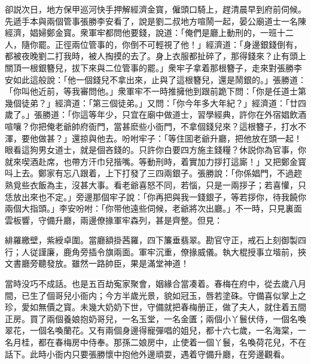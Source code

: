 卻説次日，地方保甲巡河快手押解經濟金寳，僱頭口騎上，趕清晨早到府前伺候。先遞手本與兩個管事張勝李安看了，說是劉二叔地方喧鬧一起，晏公廟道士一名陳經濟，娼婦鄭金寳。衆軍牢都問他要錢，說道：「俺們是廳上動刑的，一班十二人，隨你罷。正徑兩位管事的，你倒不可輕視了他！」經濟道：「身邊銀錢倒有，都被夜晚劉二打我時，被人掏摸的去了。身上衣服都扯碎了，那得錢來？止有頭上關頂一根銀簪兒，拔下來與二位管事的罷。」衆牢子拿着那根簪子，走來對張勝李安如此這般說：「他一個錢兒不拿出來，止與了這根簪兒，還是鬧銀的。」張勝道：「你叫他近前，等我審問他。」衆軍牢不一時推擁他到跟前跪下問：「你是任道士第幾個徒弟？」經濟道：「第三個徒弟。」又問：「你今年多大年紀？」經濟道：「廿四歲了。」張勝道：「你這等年少，只宜在廟中做道士，習學經典，許你在外宿娼飲酒喧嚷？你把俺老爺帥府衙門，當甚麽些小衙門，不拿個錢兒來？這根簪子，打水不渾，要他做甚？」還掠與他去。吩咐牢子：「等住囬老爺升廳，把他放在頭一起！眼看這狗男女道士，就是個吝錢的。只許你白要四方施主錢糧？休説你為官事，你就來喫酒赴席，也帶方汗巾兒揩嘴。等動刑時，着實加力拶打這廝！」又把鄭金寳呌上去。鄭家有忘八跟着，上下打發了三四兩銀子。張勝說：「你係娼門，不過趂熟覓些衣飯為主，沒甚大事。看老爺喜怒不同，若惱，只是一兩拶子；若喜懽，只恁放出來也不定。」旁邊那個牢子說：「你再把與我一錢銀子，等若拶你，待我饒你兩個大指頭。」李安吩咐：「你带他遠些伺候，老爺將次出廳。」不一時，只見裏面雲板響，守備升廳，兩邊僚掾軍牢森列，甚是齊整。但見：

\begin{myquote}
緋羅繳壁，紫綬卓圍。當廳額掛茜羅，四下簾垂翡翠。勘官守正，戒石上刻御製四行；人従謹廉，鹿角旁插令旗兩面。軍牢沉重，僚掾威儀。執大棍授事立堦前，挾文書廳旁聽發放。雖然一路帥臣，果是滿堂神道！
\end{myquote}

當時没巧不成話。也是五百劫寃家聚會，姻緣合當凑着。春梅在府中，從去歲八月間，已生了個哥兒小衙内；今方半歲光景，貌如冠玉，唇若塗硃。守備喜似掌上之珍，愛如無價之寳。未幾大奶奶下世，守備就把春梅册正，做了夫人，就住着五間正房。買了兩個養娘抱奶哥兒，一名玉堂，一名金匱；兩個小丫鬟伏侍，一個名喚翠花，一個名喚蘭花。又有兩個身邊得寵彈唱的姐兒，都十六七歲，一名海棠，一名月桂，都在春梅房中侍奉。那孫二娘房中，止使着一個丫鬟，名喚荷花兒，不在話下。此時小衙内只要張勝懷中抱他外邊頑耍，遇着守備升廳，在旁邊觀看。

